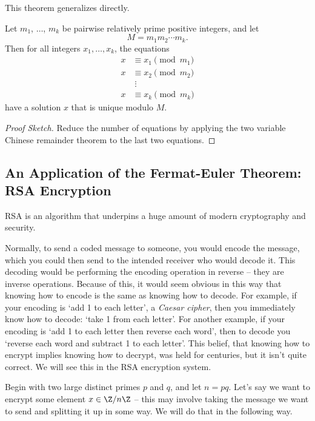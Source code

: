 \documentclass[a4paper]{scrreprt}
\begin{document}
This theorem generalizes directly.

\begin{theorem}
	Let $m_1$, $\dots$, $m_k$ be pairwise relatively prime positive integers, and let 
	$$M = m_1 m_2 \cdots m_k.
	$$ Then for all integers $x_1, \dots, x_k$, the equations
	\begin{align*}
		x & \equiv x_1 \pmod{m_1} \\
		x & \equiv x_2 \pmod{m_2} \\
			& \;\vdots \\
		x & \equiv x_k \pmod{m_k}
	\end{align*}
	have a solution $x$ that is unique modulo $M$.
\end{theorem}
\begin{proof}[Proof Sketch]
	Reduce the number of equations by applying the two variable Chinese remainder theorem to the last two equations.
\end{proof}

\subsection{An Application of the Fermat-Euler Theorem: RSA Encryption}

RSA is an algorithm that underpins a huge amount of modern cryptography and security. 

Normally, to send a coded message to someone, you would encode the message, which you could then send to the intended receiver who would decode it. This decoding would be performing the encoding operation in reverse -- they are inverse operations. Because of this, it would seem obvious in this way that knowing how to encode is the same as knowing how to decode.
For example, if your encoding is `add 1 to each letter', a \emph{
	Caesar cipher}, then you immediately know how to decode: `take 1 from each letter'.
	For another example, if your encoding is `add 1 to each letter then reverse each word', then to decode you `reverse each word and subtract 1 to each letter'. 
This belief, that knowing how to encrypt implies knowing how to decrypt, was held for centuries, but it isn't quite correct. We will see this in the RSA encryption system.

Begin with two large distinct primes $p$ and $q$, and let $n = pq$. Let's say we want to encrypt some element $x \in \Z/n\Z$ -- this may involve taking the message we want to send and splitting it up in some way. We will do that in the following way.
\end{document}
